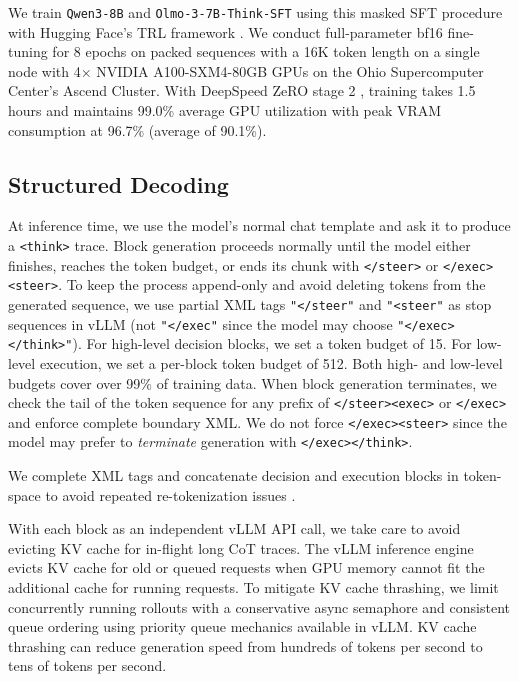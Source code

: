 \documentclass[10pt,twocolumn]{article}
\begin{document}
We train \texttt{Qwen3-8B} \citep{qwen3_2025} and
\texttt{Olmo-3-7B-Think-SFT} \citep{olmo2025olmo3} using this masked
SFT procedure with Hugging Face's TRL framework \citep{vonwerra2020trl}. We conduct
full-parameter bf16 fine-tuning for 8 epochs on packed sequences with a 16K token
length
on a single node with 4\(\times\) NVIDIA A100-SXM4-80GB GPUs on the Ohio Supercomputer
Center's Ascend Cluster. With DeepSpeed ZeRO stage 2
\citep{rasley2020deepspeed,rajbhandari2020zero}, training takes 1.5 hours and maintains 99.0\% average GPU
utilization with peak VRAM consumption at 96.7\% (average of 90.1\%).

\subsection{Structured Decoding}
\label{sec:structured-decoding}

At inference time, we use the model's normal chat template and ask it to produce
a \texttt{<think>} trace. Block generation proceeds normally until the model
either finishes, reaches the token budget, or ends its chunk with
\texttt{</steer>} or \texttt{</exec><steer>}. To keep the process
append-only and avoid deleting tokens from the generated sequence, we use partial XML
tags \texttt{"</steer"} and \texttt{"<steer"} as stop sequences in
vLLM \cite{kwon2023pagedattention} (not \texttt{"</exec"} since the model may
choose \texttt{"</exec></think>"}). For high-level decision blocks, we set a token
budget of 15. For low-level execution, we set a per-block
token budget of 512. Both high- and low-level budgets cover over 99\% of training
data. When block generation terminates, we check the tail of the token sequence for any
prefix of \texttt{</steer><exec>} or \texttt{</exec>} and enforce
complete boundary XML. We do not force \texttt{</exec><steer>} since the model may
prefer to \emph{terminate} generation with \texttt{</exec></think>}.

We complete XML tags and concatenate decision and execution blocks in
token-space to avoid repeated re-tokenization issues \cite{xu2026partialtoken}.

With each block as an independent vLLM API call, we take care
to avoid evicting KV cache for in-flight long CoT traces. The vLLM inference engine
evicts KV cache for old or queued requests when GPU memory cannot fit the additional
cache for running requests. To mitigate KV cache thrashing, we limit concurrently
running rollouts with a conservative async semaphore and consistent queue ordering
using priority queue mechanics available in vLLM. KV cache thrashing can reduce
generation speed from hundreds of tokens per second to tens of tokens per second.
\end{document}
